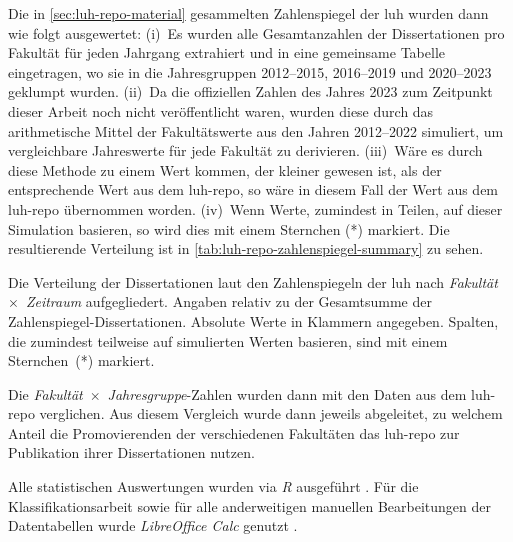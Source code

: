 Die in \cref{sec:luh-repo-material} gesammelten Zahlenspiegel der \gls{luh} wurden dann wie folgt ausgewertet:
(i)~Es wurden alle Gesamtanzahlen der Dissertationen pro Fakultät für jeden Jahrgang extrahiert und in eine gemeinsame Tabelle eingetragen, wo sie in die Jahresgruppen 2012--2015, 2016--2019 und 2020--2023 geklumpt wurden.
(ii)~Da die offiziellen Zahlen des Jahres 2023 zum Zeitpunkt dieser Arbeit noch nicht veröffentlicht waren, wurden diese durch das arithmetische Mittel der Fakultätswerte aus den Jahren 2012--2022 simuliert, um vergleichbare Jahreswerte für jede Fakultät zu derivieren.
(iii)~Wäre es durch diese Methode zu einem Wert kommen, der kleiner gewesen ist, als der entsprechende Wert aus dem \gls{luh-repo}, so wäre in diesem Fall der Wert aus dem \gls{luh-repo} übernommen worden.
(iv)~Wenn Werte, zumindest in Teilen, auf dieser Simulation basieren, so wird dies mit einem Sternchen (*) markiert.
Die resultierende Verteilung ist in \cref{tab:luh-repo-zahlenspiegel-summary} zu sehen.
\begin{table}[!htbp]
	\caption{Die Verteilung der Dissertationen laut den Zahlenspiegeln der \gls{luh} nach \textit{Fakultät}~$\times$~\textit{Zeitraum} aufgegliedert.
    Angaben relativ zu der Gesamtsumme der Zahlenspiegel-Dissertationen.
    Absolute Werte in Klammern angegeben.
    Spalten, die zumindest teilweise auf simulierten Werten basieren, sind mit einem Sternchen~(*) markiert.}
    
	\label{tab:luh-repo-zahlenspiegel-summary}
\end{table}
Die \textit{Fakultät}~$\times$~\textit{Jahresgruppe}-Zahlen wurden dann mit den Daten aus dem \gls{luh-repo} verglichen.
Aus diesem Vergleich wurde dann jeweils abgeleitet, zu welchem Anteil die Promovierenden der verschiedenen Fakultäten das \gls{luh-repo} zur Publikation ihrer Dissertationen nutzen.

Alle statistischen Auswertungen wurden via \textit{R} ausgeführt \autocite{r,dplyr,my-dataset}.
Für die Klassifikationsarbeit sowie für alle anderweitigen manuellen Bearbeitungen der Datentabellen wurde \textit{LibreOffice Calc} genutzt \autocite{libreoffice}.

